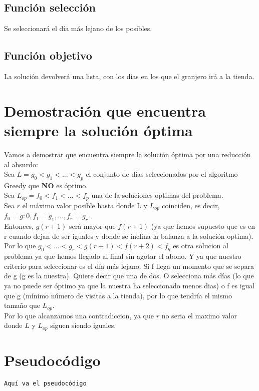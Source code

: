 \subsection{Función selección}
Se seleccionará el día más lejano de los posibles.

\subsection{Función objetivo}
La solución devolverá una lista, con los dias en los que el granjero irá a  la tienda.


\section{Demostración que encuentra siempre la solución óptima}

Vamos a demostrar que encuentra siempre la solución óptima por una reducción al absurdo:\\

Sea $ L = g_0 < g_1 < ... < g_p $ el conjunto de días seleccionados por el algoritmo Greedy que \textbf{NO} es óptimo.\\
Sea $ L_{op} = f_0 < f_1 < ... < f_p $ una de la soluciones optimas del problema.\\
Sea $r$ el máximo valor posible hasta donde L y $L_{op}$ coinciden, es decir, $f_0=g:0, f_1=g_1,...,f_r = g_r$.\\
Entonces, $g(r+1)$ será mayor que $f(r+1)$ (ya que hemos supuesto que es en r cuando dejan de ser iguales y donde se inclina la balanza a la solución optima).\\
Por lo que $g_0 < ... < g_r < g(r+1) < f(r+2) < f_q $ es otra solucion al problema ya que  hemos llegado al final sin agotar el abono. Y ya que nuestro criterio para seleccionar es el día más lejano. Si f llega un momento que se separa de g (g es la nuestra). Quiere decir que una de dos. O selecciona más días (lo que ya no puede ser óptimo ya que la nuestra ha seleccionado menos dias) o f es igual que g (mínimo número de visitas a la tienda), por lo que tendría el mismo tamaño que $L_{op}$.\\
Por lo que alcanzamos una contradiccion, ya que $r$  no seria el maximo valor donde $L$ y $L_{op}$ siguen siendo iguales.



\section{Pseudocódigo}

\begin{verbatim}
Aquí va el pseudocódigo
\end{verbatim}

